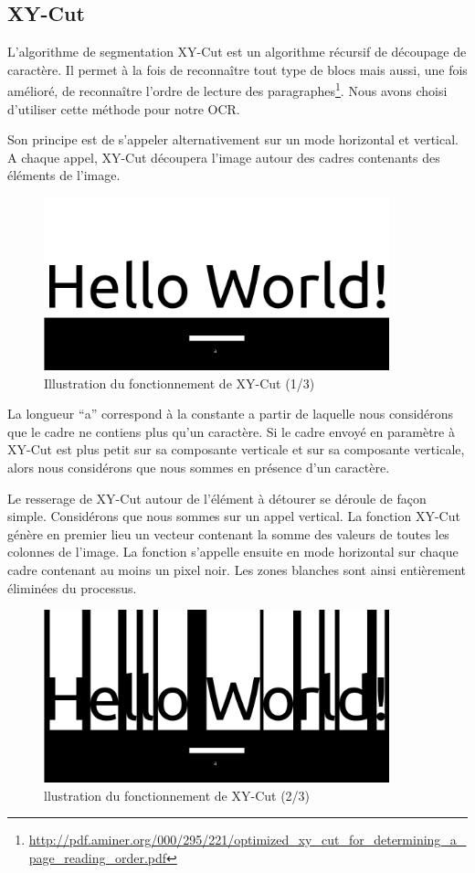 \documentclass[11pt]{report}
\begin{document}
\subsection{XY-Cut}

L'algorithme de segmentation XY-Cut est un algorithme récursif de découpage de caractère. Il permet à la fois de reconnaître tout type de blocs mais aussi, une fois amélioré, de reconnaître l'ordre de lecture des paragraphes\footnote{\url{http://pdf.aminer.org/000/295/221/optimized_xy_cut_for_determining_a_page_reading_order.pdf}}. Nous avons choisi d'utiliser cette méthode pour notre OCR.

Son principe est de s'appeler alternativement sur un mode horizontal et vertical. A chaque appel, XY-Cut découpera l'image autour des cadres contenants des éléments de l'image.

\begin{figure}[htbp]
\centering
\includegraphics[width=10cm]{1.png}
\caption{Illustration du fonctionnement de XY-Cut (1/3)}
\end{figure}

La longueur ``a'' correspond à la constante a partir de laquelle nous considérons que le cadre ne contiens plus qu'un caractère. Si le cadre envoyé en paramètre à XY-Cut est plus petit sur sa composante verticale et sur sa composante verticale, alors nous considérons que nous sommes en présence d'un caractère.

Le resserage de XY-Cut autour de l'élément à détourer se déroule de façon simple. Considérons que nous sommes sur un appel vertical. La fonction XY-Cut génère en premier lieu un vecteur contenant la somme des valeurs de toutes les colonnes de l'image. La fonction s'appelle ensuite en mode horizontal sur chaque cadre contenant au moins un pixel noir. Les zones blanches sont ainsi entièrement éliminées du processus.

\begin{figure}[htbp]
\centering
\includegraphics[width=10cm]{2.png}
\caption{llustration du fonctionnement de XY-Cut (2/3)}
\end{figure}
\end{document}
